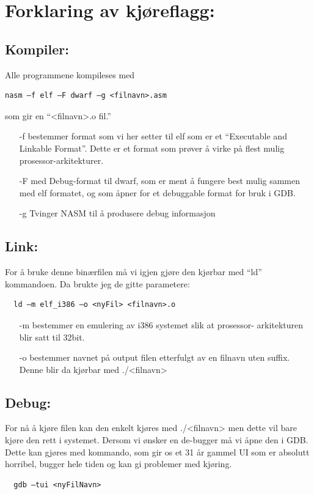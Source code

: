 \documentclass[norsk, a4paper, 12pt,]{article}
\begin{document}

\section*{Forklaring av kjøreflagg:}
\subsection*{Kompiler:}

Alle programmene kompileses med \begin{verbatim}
nasm –f elf –F dwarf –g <filnavn>.asm \end{verbatim}
som gir en ``<filnavn>.o fil.''

\begin{itemize}
  \item [-f] bestemmer format som vi her setter til elf som er et
  ``Executable and Linkable Format''. Dette er et format som prøver å
  virke på flest mulig prosessor-arkitekturer.

  \item [-F] med Debug-format til dwarf, som er ment å fungere best mulig sammen med elf
  formatet, og som åpner for et debuggable format for bruk i GDB.

  \item [-g] Tvinger NASM til å produsere debug informasjon
\end{itemize}


\subsection*{Link:}
For å bruke denne binærfilen må vi igjen gjøre den kjørbar med ``ld'' kommandoen. Da brukte jeg de gitte parametere:  \begin{verbatim}
  ld –m elf_i386 –o <nyFil> <filnavn>.o \end{verbatim}

\begin{itemize}
  \item [-m] bestemmer en emulering av i386 systemet slik at prosessor-
  arkitekturen blir satt til 32bit.

  \item [-o] bestemmer navnet på output filen etterfulgt av en filnavn uten
  suffix. Denne blir da kjørbar med ./<filnavn>
\end{itemize}
\newpage
\subsection*{Debug:}
For nå å kjøre filen kan den enkelt kjøres med ./<filnavn> men dette vil bare
kjøre den rett i systemet. Dersom vi ønsker en de-bugger må vi åpne den i GDB.
Dette kan gjøres med kommando, som gir os et 31 år
gammel UI som er absolutt horribel, bugger hele tiden og kan gi problemer med
kjøring.
\begin{verbatim}
  gdb –tui <nyFilNavn>
\end{verbatim}
\end{document}
